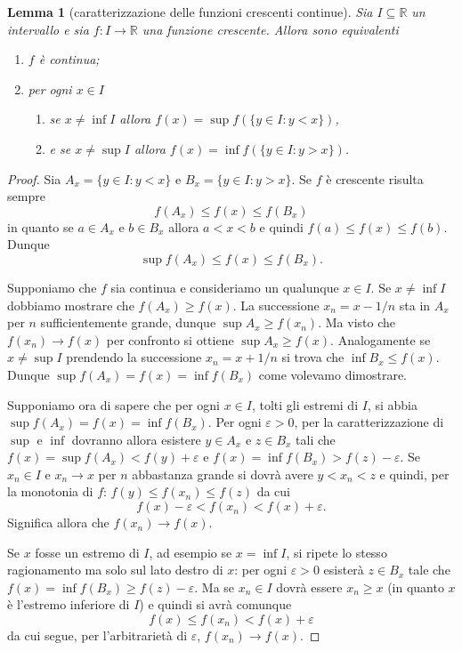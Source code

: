 \documentclass[italian,a4paper,oneside,headinclude]{scrbook}
\renewcommand{\subset}{\subseteq}
\newcommand{\eps}{\varepsilon}
\newcommand{\RR}{\mathbb R}
\newtheorem{lemma}[theorem]{Lemma}
\begin{document}
\begin{lemma}[caratterizzazione delle funzioni crescenti continue]
Sia $I\subset\RR$ un intervallo e sia $f\colon I \to \RR$ una
funzione crescente. Allora sono equivalenti
\begin{enumerate}
\item $f$ è continua;
\item per ogni $x\in I$
  \begin{enumerate}
    \item se $x\neq \inf I$ allora $f(x) = \sup f(\{y \in I\colon y<x\})$,
    \item e se $x\neq \sup I$ allora $f(x) = \inf f(\{y \in I \colon y>x\})$.
  \end{enumerate}
\end{enumerate}
\end{lemma}
%
\begin{proof}
Sia $A_x = \{y \in I\colon y<x \}$ e $B_x = \{y\in I \colon y>x\}$.
Se $f$ è crescente risulta sempre
\[
f(A_x) \le f(x) \le f(B_x)
\]
in quanto se $a\in A_x$ e $b\in B_x$ allora $a<x<b$ e quindi $f(a)\le f(x) \le f(b)$. Dunque
\[
\sup f(A_x) \le f(x) \le f(B_x).
\]

Supponiamo che $f$ sia continua e consideriamo un
qualunque $x\in I$.
Se $x\neq \inf I$ dobbiamo mostrare che $f(A_x)\ge f(x)$.
La successione $x_n = x - 1/n$ sta in $A_x$ per $n$
sufficientemente grande, dunque $\sup A_x \ge f(x_n)$.
Ma visto che $f(x_n)\to f(x)$ per confronto si ottiene $\sup A_x \ge f(x)$.
Analogamente se $x\neq \sup I$ prendendo la successione $x_n = x+1/n$
si trova che $\inf B_x \le f(x)$. Dunque $\sup f(A_x) = f(x) = \inf f(B_x)$ come volevamo dimostrare.

Supponiamo ora di sapere che
per ogni $x \in I$, tolti gli estremi di $I$, si abbia
$\sup f(A_x) = f(x) = \inf f(B_x)$.
Per ogni $\eps>0$, per la caratterizzazione di $\sup$ e $\inf$
dovranno allora esistere $y\in A_x$ e $z\in B_x$ tali che
$f(x) = \sup f(A_x) < f(y) +\eps$ e $f(x) = \inf f(B_x) > f(z)-\eps$.
Se $x_n\in I$ e $x_n \to x$ per $n$ abbastanza grande si dovrà avere
$y < x_n < z$ e quindi, per la monotonia di $f$: $f(y)\le f(x_n)\le f(z)$
da cui
\[
  f(x)-\eps < f(x_n) < f(x)+\eps.
\]
Significa allora che $f(x_n)\to f(x)$.

Se $x$ fosse un estremo di $I$, ad esempio se $x=\inf I$, si ripete
lo stesso ragionamento ma solo sul lato destro di $x$: per ogni $\eps>0$
esisterà $z\in B_x$ tale che $f(x) = \inf f(B_x) \ge f(z)-\eps$.
Ma se $x_n\in I$ dovrà essere $x_n\ge x$ (in quanto $x$ è l'estremo inferiore
di $I$) e quindi si avrà comunque
\[
  f(x) \le f(x_n) < f(x) + \eps
\]
da cui segue, per l'arbitrarietà di $\eps$, $f(x_n)\to f(x)$.
\end{proof}
\end{document}
